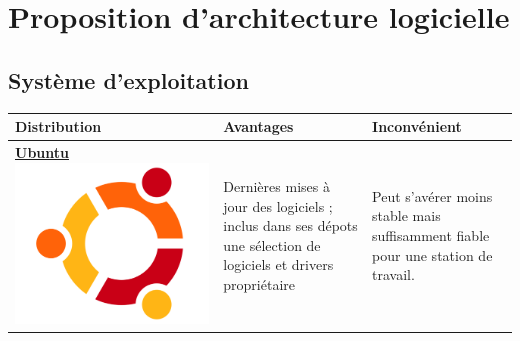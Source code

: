 \chapter{Proposition d'architecture logicielle}

\section{Système d'exploitation}

\begin{table}[ht]
	\centering
	\begin{tabularx}{\textwidth}{|C|X|X|}
		\hline
		\textbf{Distribution} & \textbf{Avantages} & \textbf{Inconvénient} \\
		\hline
		\href{https://ubuntu.com}{\textbf{Ubuntu}\vspace{5px} \centering \includegraphics[width=0.7\linewidth]{images/Ubuntu}} & Dernières mises à jour des logiciels ; inclus dans ses dépots une sélection de logiciels et drivers propriétaire & Peut s'avérer moins stable mais suffisamment fiable pour une station de travail. \\
		\hline

\end{tabularx}
\end{table}
